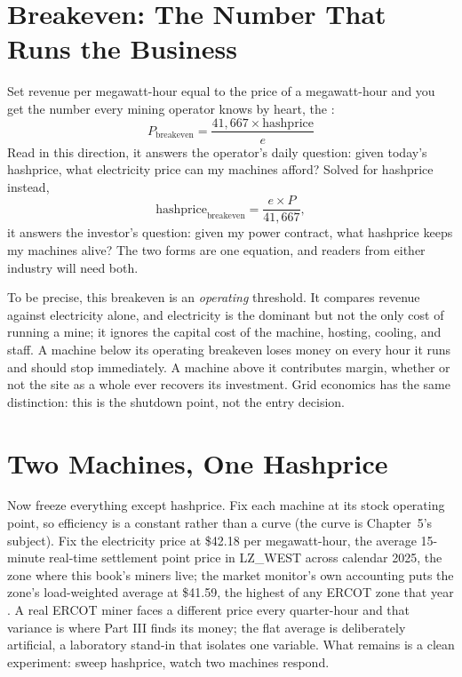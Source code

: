 \section{Breakeven: The Number That Runs the Business}

Set revenue per megawatt-hour equal to the price of a megawatt-hour and you get the number every mining operator knows by heart, the :
\[
P_{\text{breakeven}} = \frac{41{,}667 \times \text{hashprice}}{e}
\]
Read in this direction, it answers the operator's daily question: given today's hashprice, what electricity price can my machines afford? Solved for hashprice instead,
\[
\text{hashprice}_{\text{breakeven}} = \frac{e \times P}{41{,}667},
\]
it answers the investor's question: given my power contract, what hashprice keeps my machines alive? The two forms are one equation, and readers from either industry will need both.

To be precise, this breakeven is an \emph{operating} threshold. It compares revenue against electricity alone, and electricity is the dominant but not the only cost of running a mine; it ignores the capital cost of the machine, hosting, cooling, and staff. A machine below its operating breakeven loses money on every hour it runs and should stop immediately. A machine above it contributes margin, whether or not the site as a whole ever recovers its investment. Grid economics has the same distinction: this is the shutdown point, not the entry decision.

\section{Two Machines, One Hashprice}
\label{sec:sensitivity}

Now freeze everything except hashprice. Fix each machine at its stock operating point, so efficiency is a constant rather than a curve (the curve is Chapter~5's subject). Fix the electricity price at \$42.18 per megawatt-hour, the average 15-minute real-time settlement point price in LZ\_WEST across calendar 2025, the zone where this book's miners live; the market monitor's own accounting puts the zone's load-weighted average at \$41.59, the highest of any ERCOT zone that year \autocite{ercot2026rtm,potomac2026somercot}. %
A real ERCOT miner faces a different price every quarter-hour and that variance is where Part III finds its money; the flat average is deliberately artificial, a laboratory stand-in that isolates one variable. What remains is a clean experiment: sweep hashprice, watch two machines respond.

